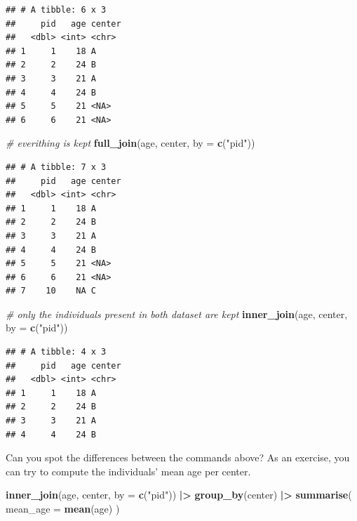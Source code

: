\documentclass[
]{book}
\newenvironment{Shaded}{\begin{snugshade}}{\end{snugshade}}
\newcommand{\AttributeTok}[1]{\textcolor[rgb]{0.13,0.29,0.53}{#1}}
\newcommand{\CommentTok}[1]{\textcolor[rgb]{0.56,0.35,0.01}{\textit{#1}}}
\newcommand{\FunctionTok}[1]{\textcolor[rgb]{0.13,0.29,0.53}{\textbf{#1}}}
\newcommand{\NormalTok}[1]{#1}
\newcommand{\SpecialCharTok}[1]{\textcolor[rgb]{0.81,0.36,0.00}{\textbf{#1}}}
\newcommand{\StringTok}[1]{\textcolor[rgb]{0.31,0.60,0.02}{#1}}
\begin{document}
\begin{verbatim}
## # A tibble: 6 x 3
##     pid   age center
##   <dbl> <int> <chr> 
## 1     1    18 A     
## 2     2    24 B     
## 3     3    21 A     
## 4     4    24 B     
## 5     5    21 <NA>  
## 6     6    21 <NA>
\end{verbatim}

\begin{Shaded}
\begin{Highlighting}[]
\CommentTok{\# everithing is kept}
\FunctionTok{full\_join}\NormalTok{(age, center, }\AttributeTok{by =} \FunctionTok{c}\NormalTok{(}\StringTok{"pid"}\NormalTok{))}
\end{Highlighting}
\end{Shaded}

\begin{verbatim}
## # A tibble: 7 x 3
##     pid   age center
##   <dbl> <int> <chr> 
## 1     1    18 A     
## 2     2    24 B     
## 3     3    21 A     
## 4     4    24 B     
## 5     5    21 <NA>  
## 6     6    21 <NA>  
## 7    10    NA C
\end{verbatim}

\begin{Shaded}
\begin{Highlighting}[]
\CommentTok{\# only the individuals present in both dataset are kept}
\FunctionTok{inner\_join}\NormalTok{(age, center, }\AttributeTok{by =} \FunctionTok{c}\NormalTok{(}\StringTok{"pid"}\NormalTok{))}
\end{Highlighting}
\end{Shaded}

\begin{verbatim}
## # A tibble: 4 x 3
##     pid   age center
##   <dbl> <int> <chr> 
## 1     1    18 A     
## 2     2    24 B     
## 3     3    21 A     
## 4     4    24 B
\end{verbatim}

Can you spot the differences between the commands above?
As an exercise, you can try to compute the individuals' mean age per center.

\begin{Shaded}
\begin{Highlighting}[]
\FunctionTok{inner\_join}\NormalTok{(age, center, }\AttributeTok{by =} \FunctionTok{c}\NormalTok{(}\StringTok{"pid"}\NormalTok{)) }\SpecialCharTok{|\textgreater{}}
  \FunctionTok{group\_by}\NormalTok{(center) }\SpecialCharTok{|\textgreater{}}
  \FunctionTok{summarise}\NormalTok{(}
    \AttributeTok{mean\_age =} \FunctionTok{mean}\NormalTok{(age)}
\NormalTok{  )}
\end{Highlighting}
\end{Shaded}
\end{document}
